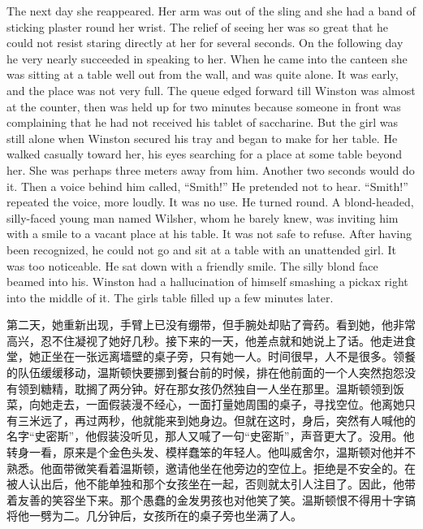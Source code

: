 \begin{paracol}{2}
The next day she reappeared. Her arm was out of the sling and she had a
band of sticking plaster round her wrist. The relief of seeing her was
so great that he could not resist staring directly at her for several
seconds. On the following day he very nearly succeeded in speaking to
her. When he came into the canteen she was sitting at a table well out
from the wall, and was quite alone. It was early, and the place was not
very full. The queue edged forward till Winston was almost at the
counter, then was held up for two minutes because someone in front was
complaining that he had not received his tablet of saccharine. But the
girl was still alone when Winston secured his tray and began to make for
her table. He walked casually toward her, his eyes searching for a place
at some table beyond her. She was perhaps three meters away from him.
Another two seconds would do it. Then a voice behind him called,
``Smith!'' He pretended not to hear. ``Smith!'' repeated the voice, more
loudly. It was no use. He turned round. A blond-headed, silly-faced
young man named Wilsher, whom he barely knew, was inviting him with a
smile to a vacant place at his table. It was not safe to refuse. After
having been recognized, he could not go and sit at a table with an
unattended girl. It was too noticeable. He sat down with a friendly
smile. The silly blond face beamed into his. Winston had a hallucination
of himself smashing a pickax right into the middle of it. The
girl\textquotesingle s table filled up a few minutes later.

\switchcolumn

第二天，她重新出现，手臂上已没有绷带，但手腕处却贴了膏药。看到她，他非常高兴，忍不住凝视了她好几秒。接下来的一天，他差点就和她说上了话。他走进食堂，她正坐在一张远离墙壁的桌子旁，只有她一人。时间很早，人不是很多。领餐的队伍缓缓移动，温斯顿快要挪到餐台前的时候，排在他前面的一个人突然抱怨没有领到糖精，耽搁了两分钟。好在那女孩仍然独自一人坐在那里。温斯顿领到饭菜，向她走去，一面假装漫不经心，一面打量她周围的桌子，寻找空位。他离她只有三米远了，再过两秒，他就能来到她身边。但就在这时，身后，突然有人喊他的名字``史密斯''，他假装没听见，那人又喊了一句``史密斯''，声音更大了。没用。他转身一看，原来是个金色头发、模样蠢笨的年轻人。他叫威舍尔，温斯顿对他并不熟悉。他面带微笑看着温斯顿，邀请他坐在他旁边的空位上。拒绝是不安全的。在被人认出后，他不能单独和那个女孩坐在一起，否则就太引人注目了。因此，他带着友善的笑容坐下来。那个愚蠢的金发男孩也对他笑了笑。温斯顿恨不得用十字镐将他一劈为二。几分钟后，女孩所在的桌子旁也坐满了人。

\switchcolumn*


\end{paracol}
